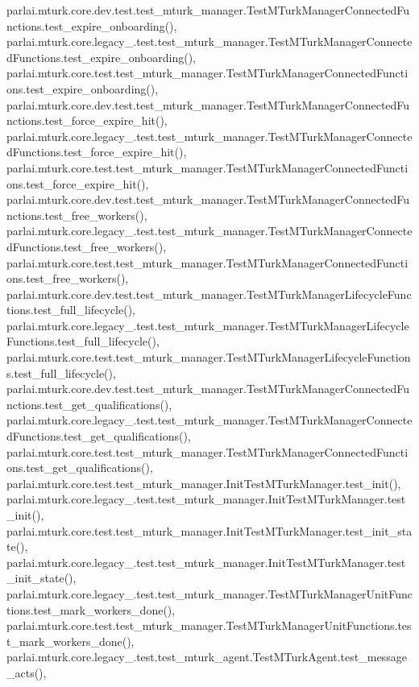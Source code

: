 parlai.\+mturk.\+core.\+dev.\+test.\+test\+\_\+mturk\+\_\+manager.\+Test\+M\+Turk\+Manager\+Connected\+Functions.\+test\+\_\+expire\+\_\+onboarding(), parlai.\+mturk.\+core.\+legacy\+\_.\+test.\+test\+\_\+mturk\+\_\+manager.\+Test\+M\+Turk\+Manager\+Connected\+Functions.\+test\+\_\+expire\+\_\+onboarding(), parlai.\+mturk.\+core.\+test.\+test\+\_\+mturk\+\_\+manager.\+Test\+M\+Turk\+Manager\+Connected\+Functions.\+test\+\_\+expire\+\_\+onboarding(), parlai.\+mturk.\+core.\+dev.\+test.\+test\+\_\+mturk\+\_\+manager.\+Test\+M\+Turk\+Manager\+Connected\+Functions.\+test\+\_\+force\+\_\+expire\+\_\+hit(), parlai.\+mturk.\+core.\+legacy\+\_.\+test.\+test\+\_\+mturk\+\_\+manager.\+Test\+M\+Turk\+Manager\+Connected\+Functions.\+test\+\_\+force\+\_\+expire\+\_\+hit(), parlai.\+mturk.\+core.\+test.\+test\+\_\+mturk\+\_\+manager.\+Test\+M\+Turk\+Manager\+Connected\+Functions.\+test\+\_\+force\+\_\+expire\+\_\+hit(), parlai.\+mturk.\+core.\+dev.\+test.\+test\+\_\+mturk\+\_\+manager.\+Test\+M\+Turk\+Manager\+Connected\+Functions.\+test\+\_\+free\+\_\+workers(), parlai.\+mturk.\+core.\+legacy\+\_.\+test.\+test\+\_\+mturk\+\_\+manager.\+Test\+M\+Turk\+Manager\+Connected\+Functions.\+test\+\_\+free\+\_\+workers(), parlai.\+mturk.\+core.\+test.\+test\+\_\+mturk\+\_\+manager.\+Test\+M\+Turk\+Manager\+Connected\+Functions.\+test\+\_\+free\+\_\+workers(), parlai.\+mturk.\+core.\+dev.\+test.\+test\+\_\+mturk\+\_\+manager.\+Test\+M\+Turk\+Manager\+Lifecycle\+Functions.\+test\+\_\+full\+\_\+lifecycle(), parlai.\+mturk.\+core.\+legacy\+\_.\+test.\+test\+\_\+mturk\+\_\+manager.\+Test\+M\+Turk\+Manager\+Lifecycle\+Functions.\+test\+\_\+full\+\_\+lifecycle(), parlai.\+mturk.\+core.\+test.\+test\+\_\+mturk\+\_\+manager.\+Test\+M\+Turk\+Manager\+Lifecycle\+Functions.\+test\+\_\+full\+\_\+lifecycle(), parlai.\+mturk.\+core.\+dev.\+test.\+test\+\_\+mturk\+\_\+manager.\+Test\+M\+Turk\+Manager\+Connected\+Functions.\+test\+\_\+get\+\_\+qualifications(), parlai.\+mturk.\+core.\+legacy\+\_.\+test.\+test\+\_\+mturk\+\_\+manager.\+Test\+M\+Turk\+Manager\+Connected\+Functions.\+test\+\_\+get\+\_\+qualifications(), parlai.\+mturk.\+core.\+test.\+test\+\_\+mturk\+\_\+manager.\+Test\+M\+Turk\+Manager\+Connected\+Functions.\+test\+\_\+get\+\_\+qualifications(), parlai.\+mturk.\+core.\+test.\+test\+\_\+mturk\+\_\+manager.\+Init\+Test\+M\+Turk\+Manager.\+test\+\_\+init(), parlai.\+mturk.\+core.\+legacy\+\_.\+test.\+test\+\_\+mturk\+\_\+manager.\+Init\+Test\+M\+Turk\+Manager.\+test\+\_\+init(), parlai.\+mturk.\+core.\+test.\+test\+\_\+mturk\+\_\+manager.\+Init\+Test\+M\+Turk\+Manager.\+test\+\_\+init\+\_\+state(), parlai.\+mturk.\+core.\+legacy\+\_.\+test.\+test\+\_\+mturk\+\_\+manager.\+Init\+Test\+M\+Turk\+Manager.\+test\+\_\+init\+\_\+state(), parlai.\+mturk.\+core.\+legacy\+\_.\+test.\+test\+\_\+mturk\+\_\+manager.\+Test\+M\+Turk\+Manager\+Unit\+Functions.\+test\+\_\+mark\+\_\+workers\+\_\+done(), parlai.\+mturk.\+core.\+test.\+test\+\_\+mturk\+\_\+manager.\+Test\+M\+Turk\+Manager\+Unit\+Functions.\+test\+\_\+mark\+\_\+workers\+\_\+done(), parlai.\+mturk.\+core.\+legacy\+\_.\+test.\+test\+\_\+mturk\+\_\+agent.\+Test\+M\+Turk\+Agent.\+test\+\_\+message\+\_\+acts(), 